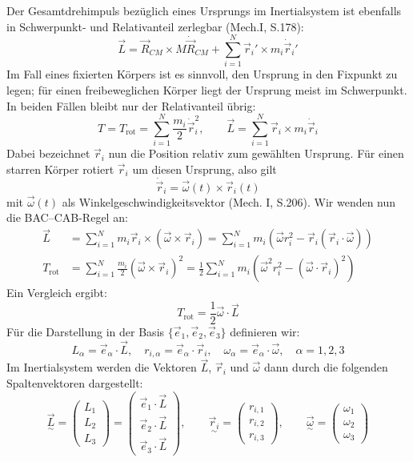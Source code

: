 \documentclass[10pt, letterpaper]{article}
\begin{document}
Der Gesamtdrehimpuls bezüglich eines Ursprungs im Inertialsystem ist ebenfalls in Schwerpunkt- und Relativanteil zerlegbar (Mech.I, S.178):
\[
\vec{L} = \vec{R}_{CM} \times M \dot{\vec{R}}_{CM} + \sum_{i=1}^N \vec{r}_i' \times m_i \dot{\vec{r}}_i'
\]
Im Fall eines fixierten Körpers ist es sinnvoll, den Ursprung in den Fixpunkt zu legen; für einen freibeweglichen Körper liegt der Ursprung meist im Schwerpunkt. In beiden Fällen bleibt nur der Relativanteil übrig:
\[
T = T_{\text{rot}} = \sum_{i=1}^N \frac{m_i}{2} \dot{\vec{r}}_i^2, \qquad
\vec{L} = \sum_{i=1}^N \vec{r}_i \times m_i \dot{\vec{r}}_i
\]
Dabei bezeichnet $\vec{r}_i$ nun die Position relativ zum gewählten Ursprung. Für einen starren Körper rotiert $\vec{r}_i$ um diesen Ursprung, also gilt
\[
\dot{\vec{r}}_i = \vec{\omega}(t) \times \vec{r}_i(t)
\]
mit $\vec{\omega}(t)$ als Winkelgeschwindigkeitsvektor (Mech. I, S.206). Wir wenden nun die BAC–CAB-Regel an:
\[
\begin{aligned}
\vec{L} &= \sum_{i=1}^N m_i \vec{r}_i \times (\vec{\omega} \times \vec{r}_i)
= \sum_{i=1}^N m_i \left( \vec{\omega} r_i^2 - \vec{r}_i (\vec{r}_i \cdot \vec{\omega}) \right) \\
T_{\text{rot}} &= \sum_{i=1}^N \frac{m_i}{2} (\vec{\omega} \times \vec{r}_i)^2
= \frac{1}{2} \sum_{i=1}^N m_i \left( \vec{\omega}^2 r_i^2 - (\vec{\omega} \cdot \vec{r}_i)^2 \right)
\end{aligned}
\]
Ein Vergleich ergibt:
\[
\boxed{T_{\text{rot}} = \frac{1}{2} \vec{\omega} \cdot \vec{L}}
\]
Für die Darstellung in der Basis $\{ \vec{e}_1, \vec{e}_2, \vec{e}_3 \}$ definieren wir:
\[
L_\alpha = \vec{e}_\alpha \cdot \vec{L}, \quad r_{i,\alpha} = \vec{e}_\alpha \cdot \vec{r}_i, \quad \omega_\alpha = \vec{e}_\alpha \cdot \vec{\omega}, \quad \alpha = 1,2,3
\]
Im Inertialsystem werden die Vektoren $\vec{L}$, $\vec{r}_i$ und $\vec{\omega}$ dann durch die folgenden Spaltenvektoren dargestellt:
\[
\underset{\sim}{\vec{L}} =
\begin{pmatrix}
L_1 \\
L_2 \\
L_3
\end{pmatrix}
=
\begin{pmatrix}
\vec{e}_1 \cdot \vec{L} \\
\vec{e}_2 \cdot \vec{L} \\
\vec{e}_3 \cdot \vec{L}
\end{pmatrix}, \qquad
\underset{\sim}{\vec{r}_i} =
\begin{pmatrix}
r_{i,1} \\
r_{i,2} \\
r_{i,3}
\end{pmatrix}, \qquad
\underset{\sim}{\vec{\omega}} =
\begin{pmatrix}
\omega_1 \\
\omega_2 \\
\omega_3
\end{pmatrix}
\]
\end{document}
